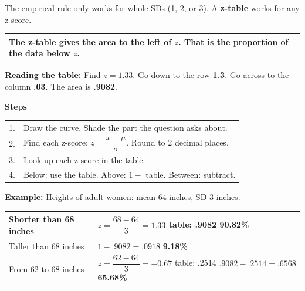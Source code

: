 \documentclass[11pt]{article}
\begin{document}

The empirical rule only works for whole SDs (1, 2, or 3). A \textbf{z-table} works for any z-score.

\vspace{0.5em}
\begin{tabular}{|>{\raggedright\arraybackslash}p{6.7in}|}\hline
The \textbf{z-table} gives the area to the \textbf{left} of $z$. That is the proportion of the data \textbf{below} $z$.\\ \hline
\end{tabular}

\vspace{0.6em}
\textbf{Reading the table:} Find $z = 1.33$. Go down to the row \textbf{1.3}. Go across to the column \textbf{.03}. The area is \textbf{.9082}.

\begin{center}\end{center}

\textbf{Steps}

\vspace{0.2em}
\begin{tabular}{@{}ll}
1. & Draw the curve. Shade the part the question asks about.\\
2. & Find each z-score: \; $z = \dfrac{x - \mu}{\sigma}$. Round to 2 decimal places.\\[0.5em]
3. & Look up each z-score in the table.\\
4. & Below: use the table. \; Above: $1 -$ table. \; Between: subtract.\\
\end{tabular}

\vspace{0.8em}
\textbf{Example:} Heights of adult women: mean 64 inches, SD 3 inches.

\begin{center}\end{center}

\renewcommand{\arraystretch}{2.3}
\begin{tabular}{|l|l|}\hline
Shorter than 68 inches &
$z = \dfrac{68 - 64}{3} = 1.33$ \quad table: .9082 \quad \textbf{90.82\%}\\ \hline
Taller than 68 inches &
$1 - .9082 = .0918$ \quad \textbf{9.18\%}\\ \hline
From 62 to 68 inches &
$z = \dfrac{62 - 64}{3} = -0.67$ \quad table: .2514 \quad $.9082 - .2514 = .6568$ \quad \textbf{65.68\%}\\ \hline
\end{tabular}
\end{document}
